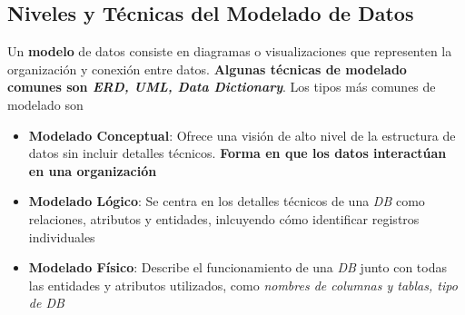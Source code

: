 \subsection{Niveles y Técnicas del Modelado de Datos}
Un \textbf{modelo} de datos consiste en diagramas o visualizaciones que representen la organización y conexión entre datos. \textbf{Algunas técnicas de modelado comunes son \textit{ERD, UML, Data Dictionary}}. Los tipos más comunes de modelado son 
\begin{itemize}
    \item {\textbf{Modelado Conceptual}: Ofrece una visión de alto nivel de la estructura de datos sin incluir detalles técnicos. \textbf{Forma en que los datos interactúan en una organización}}
    \item {\textbf{Modelado Lógico}: Se centra en los detalles técnicos de una \textit{DB} como relaciones, atributos y entidades, inlcuyendo cómo identificar registros individuales}
    \item {\textbf{Modelado Físico}: Describe el funcionamiento de una \textit{DB} junto con todas las entidades y atributos utilizados, como \textit{ nombres de columnas y tablas, tipo de DB}} 
\end{itemize}

